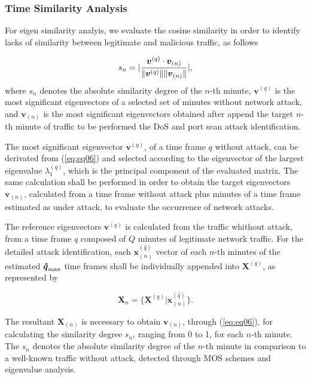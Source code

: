 \documentclass{bmcart}
\DeclarePairedDelimiter\abs{\lvert}{\rvert}%
\DeclarePairedDelimiter\norm{\lVert}{\rVert}%
\begin{document}
\subsubsection{Time Similarity Analysis}
\label{sec:prop_TimeSimilarityAnalysis}

For eigen similarity analyis, we evaluate the cosine similarity in order to identify lacks of similarity between legitimate and malicious traffic, as follows

\begin{equation}\label{eq:eq11}
s_n = \abs{\frac{\boldsymbol{v}^{(q)} \cdot \boldsymbol{v}_{(n)}}{\norm{\boldsymbol{v}^{(q)}}\norm{\boldsymbol{v}_{(n)}}}},
\end{equation}
where $s_n$ denotes the absolute similarity degree of the $n$-th minute, $\boldsymbol{v}^{(q)}$ is the most significant eigenvectors of a selected set of minutes without network attack, and $\boldsymbol{v}_{(n)}$ is the most significant eigenvectors obtained after append the target $n$-th minute of traffic to be performed the DoS and port scan attack identification.

The most significant eigenvector $\boldsymbol{v}^{(q)}$, of a time frame $q$ without attack, can be derivated from (\ref{eq:eq06}) and selected according to the eigenvector of the largest eigenvalue $\lambda_1^{(q)}$, which is the principal component of the evaluated matrix. The same calculation shall be performed in order to obtain the target eigenvectors $\boldsymbol{v}_{(n)}$, calculated from a time frame without attack plus minutes of a time frame estimated as under attack, to evaluate the occurrence of network attacks. 

The reference eigenvectors $\boldsymbol{v}^{(q)}$ is calculated from the traffic whithout attack, from a time frame $q$ composed of $Q$ minutes of legitimate network traffic. For the detailed attack identification, each $\boldsymbol{x}^{(\hat{q})}_{(n)}$ vector of each $n$-th minutes of the estimated $\rm{\boldsymbol{\hat{q}}}_{\rm max}$ time frames shall be individually appended into $\boldsymbol{X}^{(q)}$, as represented by

\begin{equation}\label{eq:eq12}
\boldsymbol{X}_{n} = \{\boldsymbol{X}^{(q)} | \boldsymbol{x}^{(\hat{q})}_{(n)}\}.
\end{equation}

The resultant $\boldsymbol{X}_{(n)}$ is necessary to obtain $\boldsymbol{v}_{(n)}$, through (\ref{eq:eq06}), for calculating the similarity degree $s_n$, ranging from 0 to 1, for each $n$-th minute. The $s_n$ denotes the absolute similarity degree of the $n$-th minute in comparison to a well-known traffic without attack, detected through MOS schemes and eigenvalue analysis.
\end{document}
